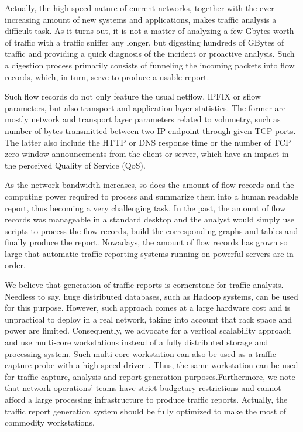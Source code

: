 \documentclass[AMA,STIX1COL]{WileyNJD-v2}
\begin{document}
Actually, the high-speed nature of current networks, together with the ever-increasing amount of new systems and applications, makes traffic analysis a difficult task. As it turns out, it is not a matter of analyzing a few Gbytes worth of traffic with a traffic sniffer any longer, but  digesting hundreds of GBytes of traffic and providing a quick diagnosis of the incident or proactive analysis. Such a digestion process primarily consists of funneling the incoming packets into flow records, which, in turn, serve to produce a usable report.  %

Such flow records do not only feature the usual netflow, IPFIX or sflow parameters, but also transport and application layer statistics. The former are mostly network and transport layer parameters related to volumetry, such as number of bytes transmitted between two IP endpoint through given TCP ports. The latter also include the HTTP or DNS response time or the number of TCP zero window announcements from the client or server, which have an impact in the perceived Quality of Service (QoS).

As the network bandwidth increases, so does the amount of flow records and the computing power required to process and summarize them  into a human readable report, thus becoming a very challenging task. In the past, the amount of flow records was manageable in a standard desktop and the analyst would simply use scripts to process the flow records, build the corresponding graphs and tables and finally produce the report. Nowadays, the amount of flow records has grown so large that automatic traffic reporting systems running on powerful servers are in order.

We believe that generation of traffic reports is cornerstone for traffic analysis. Needless to say, huge distributed databases, such as Hadoop systems, can be used for this purpose. However, such approach comes at a large hardware cost and is unpractical to deploy in a real network, taking into account that rack space and power are limited. Consequently, we advocate for a vertical scalability approach and use multi-core workstations instead of a fully distributed storage and processing system. Such multi-core workstation can also be used as a traffic capture probe with a high-speed driver~\cite{M3OMON}. Thus, the same workstation can be used for traffic capture, analysis and report generation purposes.Furthermore, we note that network operations' teams have strict budgetary restrictions and cannot afford a large processing infrastructure to produce traffic reports. Actually, the traffic report generation system should be fully optimized to make the most of commodity workstations.
\end{document}
